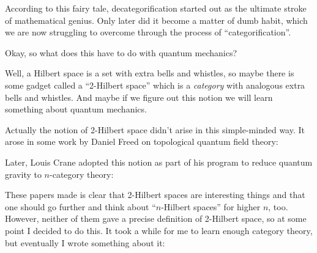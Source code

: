 \documentclass{article}
\def\tightlist{}
\renewcommand{\texttt}[1]{%
  \begingroup
  \ttfamily
  \begingroup\lccode`~=`/\lowercase{\endgroup\def~}{/\discretionary{}{}{}}%
  \begingroup\lccode`~=`[\lowercase{\endgroup\def~}{[\discretionary{}{}{}}%
  \begingroup\lccode`~=`.\lowercase{\endgroup\def~}{.\discretionary{}{}{}}%
  \catcode`/=\active\catcode`[=\active\catcode`.=\active
  \scantokens{#1\noexpand}%
  \endgroup
}
\begin{document}
According to this fairy tale, decategorification started out as the
ultimate stroke of mathematical genius. Only later did it become a
matter of dumb habit, which we are now struggling to overcome through
the process of ``categorification''.

Okay, so what does this have to do with quantum mechanics?

Well, a Hilbert space is a set with extra bells and whistles, so maybe
there is some gadget called a ``2-Hilbert space'' which is a
\emph{category} with analogous extra bells and whistles. And maybe if we
figure out this notion we will learn something about quantum mechanics.

Actually the notion of 2-Hilbert space didn't arise in this
simple-minded way. It arose in some work by Daniel Freed on topological
quantum field theory:


Later, Louis Crane adopted this notion as part of his program to reduce
quantum gravity to \(n\)-category theory:


These papers made is clear that 2-Hilbert spaces are interesting things
and that one should go further and think about ``\(n\)-Hilbert spaces''
for higher \(n\), too. However, neither of them gave a precise
definition of 2-Hilbert space, so at some point I decided to do this. It
took a while for me to learn enough category theory, but eventually I
wrote something about it:

\end{document}

